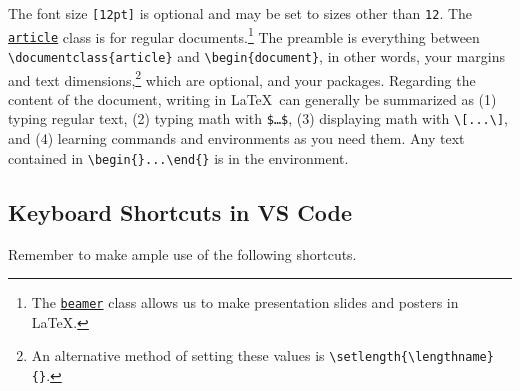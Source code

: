 \documentclass{article} 		%
\begin{document}
The font size \texttt{[12pt]} is optional and may be set to sizes other than \texttt{12}. The \href{https://ctan.org/pkg/article}{\texttt{article}} class is for regular documents.\footnote{
	The \href{https://ctan.org/pkg/beamer}{\texttt{beamer}} class allows us to make presentation slides and posters in \LaTeX. 
}
The preamble is everything between \verb$\documentclass{article}$ and \verb$\begin{document}$, in other words, your margins and text dimensions,\footnote{
	An alternative method of setting these values is \texttt{\textbackslash setlength\{\textbackslash lengthname\}\{}\texttt{\}}. 
} 
which are optional, and your packages. \p
Regarding the content of the document, writing in \LaTeX\ can generally be summarized as (1) typing regular text, (2) typing math with \texttt{\$\dots\$}, (3) displaying math with \verb$\[...\]$, and (4) learning commands and environments as you need them. Any text contained in \verb$\begin{$\verb$}...\end{$\verb$}$ is in the  environment. 

\subsection{Keyboard Shortcuts in VS Code} \label{subsec:shortcuts}
Remember to make ample use of the following shortcuts. 
\end{document}
